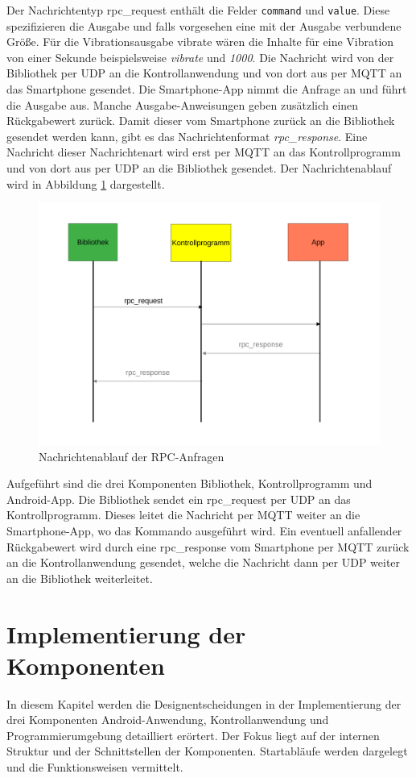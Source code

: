 \documentclass[11pt,a4paper]{report}
\begin{document}
Der Nachrichtentyp rpc\_request enthält die Felder \texttt{command} und \texttt{value}.
Diese spezifizieren die Ausgabe und falls vorgesehen eine mit der Ausgabe verbundene Größe.
Für die Vibrationsausgabe vibrate wären die Inhalte für eine Vibration von einer Sekunde beispielsweise \textit{vibrate} und \textit{1000}.
Die Nachricht wird von der Bibliothek per UDP an die Kontrollanwendung und von dort aus per MQTT an das Smartphone gesendet.
Die Smartphone-App nimmt die Anfrage an und führt die Ausgabe aus.
Manche Ausgabe-Anweisungen geben zusätzlich einen Rückgabewert zurück.
Damit dieser vom Smartphone zurück an die Bibliothek gesendet werden kann, gibt es das Nachrichtenformat \textit{rpc\_response}.
Eine Nachricht dieser Nachrichtenart wird erst per MQTT an das Kontrollprogramm und von dort aus per UDP an die Bibliothek gesendet.
Der Nachrichtenablauf wird in Abbildung \ref{fig:message_flow_rpc} dargestellt.
\begin{figure}[htbp]
\centering
\includegraphics[width=.8\textwidth]{images/message_flow_rpc.pdf}
\caption{Nachrichtenablauf der RPC-Anfragen}
\label{fig:message_flow_rpc}
\end{figure}
Aufgeführt sind die drei Komponenten Bibliothek, Kontrollprogramm und Android-App.
Die Bibliothek sendet ein rpc\_request per UDP an das Kontrollprogramm.
Dieses leitet die Nachricht per MQTT weiter an die Smartphone-App, wo das Kommando ausgeführt wird.
Ein eventuell anfallender Rückgabewert wird durch eine rpc\_response vom Smartphone per MQTT zurück an die Kontrollanwendung gesendet, welche die Nachricht dann per UDP weiter an die Bibliothek weiterleitet.

\chapter{Implementierung der Komponenten}
In diesem Kapitel werden die Designentscheidungen in der Implementierung der drei Komponenten Android-Anwendung, Kontrollanwendung und Programmierumgebung detailliert erörtert.
Der Fokus liegt auf der internen Struktur und der Schnittstellen der Komponenten.
Startabläufe werden dargelegt und die Funktionsweisen vermittelt.
\end{document}
